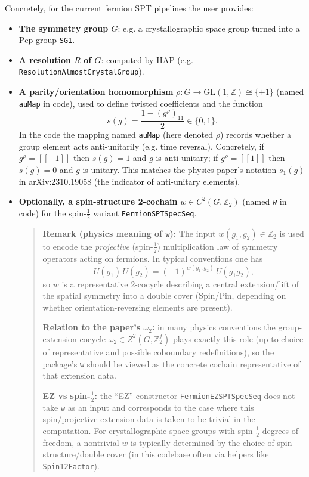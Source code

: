 \documentclass{SciPost}
\begin{document}
Concretely, for the current fermion SPT pipelines the user provides:
\begin{itemize}
    \item \textbf{The symmetry group $G$}: e.g. a crystallographic space group turned into a Pcp group \texttt{SG1}.
    \item \textbf{A resolution $R$ of $G$}: computed by HAP (e.g. \texttt{ResolutionAlmostCrystalGroup}).
    \item \textbf{A parity/orientation homomorphism} $\rho: G\to \mathrm{GL}(1,\mathbb{Z})\cong\{\pm1\}$ (named \texttt{auMap} in code), used to define twisted coefficients and the function
    \begin{equation}
    s(g)=\frac{1-(g^{\rho})_{11}}{2}\in\{0,1\}.
    \end{equation}
    In the code the mapping named \texttt{auMap} (here denoted $\rho$) records whether a group element acts anti-unitarily (e.g. time reversal). Concretely, if $g^{\rho}=[[ -1 ]]$ then $s(g)=1$ and $g$ is anti-unitary; if $g^{\rho}=[[1]]$ then $s(g)=0$ and $g$ is unitary. This matches the physics paper's notation $s_1(g)$ in arXiv:2310.19058 (the indicator of anti-unitary elements).
    \item \textbf{Optionally, a spin-structure 2-cochain} $w\in C^2(G,\mathbb{Z}_2)$ (named \texttt{w} in code) for the spin-$\tfrac12$ variant \texttt{FermionSPTSpecSeq}.
    \begin{quotation}
    \noindent\textbf{Remark (physics meaning of \texttt{w}):} The input $w(g_1,g_2)\in\mathbb{Z}_2$ is used to encode the \emph{projective} (spin-$\tfrac12$) multiplication law of symmetry operators acting on fermions. In typical conventions one has
    \begin{equation}
    U(g_1)\,U(g_2)=(-1)^{w(g_1,g_2)}\,U(g_1g_2),
    \end{equation}
    so $w$ is a representative 2-cocycle describing a central extension/lift of the spatial symmetry into a double cover (Spin/Pin, depending on whether orientation-reversing elements are present).

    	\textbf{Relation to the paper's $\omega_2$:} in many physics conventions the group-extension cocycle $\omega_2\in Z^2(G,\mathbb{Z}_2^f)$ plays exactly this role (up to choice of representative and possible coboundary redefinitions), so the package's \texttt{w} should be viewed as the concrete cochain representative of that extension data.

    	\textbf{EZ vs spin-$\tfrac12$:} the ``EZ'' constructor \texttt{FermionEZSPTSpecSeq} does not take \texttt{w} as an input and corresponds to the case where this spin/projective extension data is taken to be trivial in the computation. For crystallographic space groups with spin-$\tfrac12$ degrees of freedom, a nontrivial $w$ is typically determined by the choice of spin structure/double cover (in this codebase often via helpers like \texttt{Spin12Factor}).
    \end{quotation}
\end{itemize}
\end{document}
